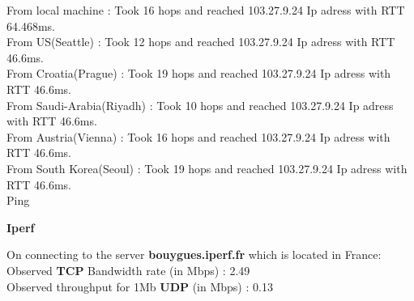 \documentclass{article}
\theoremstyle{remark}
\newcommand{\tbf}[1]{\textbf{#1}}
\begin{document}
From local machine           : Took 16 hops and reached 103.27.9.24 Ip adress with RTT 64.468ms.\\
From US(Seattle)           : Took 12 hops and reached 103.27.9.24 Ip adress with RTT 46.6ms. \\
From Croatia(Prague)         : Took 19 hops and reached 103.27.9.24 Ip adress with RTT 46.6ms.  \\
From Saudi-Arabia(Riyadh)  : Took 10 hops and reached 103.27.9.24 Ip adress with RTT 46.6ms. \\
From Austria(Vienna)       : Took 16 hops and reached 103.27.9.24 Ip adress with RTT 46.6ms. \\
From South Korea(Seoul)      : Took 19 hops and reached 103.27.9.24 Ip adress with RTT 46.6ms.\\  



\large{Ping}

\begin{table}[H]
    \centering
    \caption{Ping Data}
    \label{Table 1:}
\end{table}

\tbf{\large{Iperf}}

On connecting to the server \tbf{bouygues.iperf.fr} which is located in France: \\
Observed \tbf{TCP} Bandwidth rate (in Mbps) : 2.49  \\
Observed throughput for 1Mb \tbf{UDP} (in Mbps) : 0.13 \\
\end{document}
